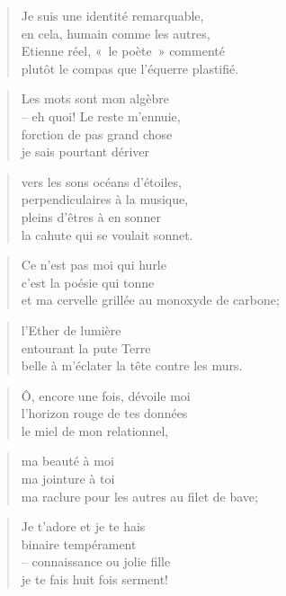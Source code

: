   \begin{verse}
    Je suis une identité remarquable,\\
    en cela, humain comme les autres,\\
    Etienne réel, «~le poète~» commenté\\
    plutôt le compas que l’équerre plastifié.
  \end{verse}
  \begin{verse}
    Les mots sont mon algèbre\\
    -- eh quoi! Le reste m’ennuie,\\
    forction de pas grand chose\\
    je sais pourtant dériver
  \end{verse}
  \begin{verse}
    vers les sons océans d’étoiles,\\
    perpendiculaires à la musique,\\
    pleins d’êtres à en sonner\\
    la cahute qui se voulait sonnet.
  \end{verse}
  \begin{verse}
    Ce n’est pas moi qui hurle\\
    c’est la poésie qui tonne\\
    et ma cervelle grillée au monoxyde de carbone;
  \end{verse}
  \begin{verse}
    l’Ether de lumière\\
    entourant la pute Terre\\
    belle à m’éclater la tête contre les murs.
  \end{verse}
  \begin{verse}
    Ô, encore une fois, dévoile moi\\
    l’horizon rouge de tes données\\
    le miel de mon relationnel,
  \end{verse}
  \begin{verse}
    ma beauté à moi\\
    ma jointure à toi\\
    ma raclure pour les autres au filet de bave;
  \end{verse}
  \begin{verse}
    Je t’adore et je te hais\\
    binaire tempérament\\
    -- connaissance ou jolie fille\\
    je te fais huit fois serment!
  \end{verse}
